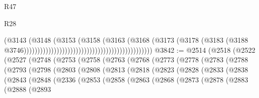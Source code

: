 \begin{lexlean}{R47}
\begin{lexlean}{R28}
\begin{coremodule}
{{{{{{{{{{{{{{{{{{{{{{{{{{{{{{{{{{{{{{{{{{{{{{{{{{{{{{{{{{{{{{{{{{{{{{{{{{{{{{{{{{{{{{{{{{{{{{{{{{{{{{{{{{{{{{{{{{{{{{{{{{{{{{{{{{{{{                                                                              (@3143
                                                                                (@3148
                                                                                  (@3153
                                                                                    (@3158
                                                                                      (@3163
                                                                                        (@3168
                                                                                          (@3173
                                                                                            (@3178
                                                                                              (@3183
                                                                                                (@3188
                                                                                                  @3746)))))))))))))))))))))))))))))))))))))))))))))))
@3842 := @2514
    (@2518
      (@2522
        (@2527
          (@2748
            (@2753
              (@2758
                (@2763
                  (@2768
                    (@2773
                      (@2778
                        (@2783
                          (@2788
                            (@2793
                              (@2798
                                (@2803
                                  (@2808
                                    (@2813
                                      (@2818
                                        (@2823
                                          (@2828
                                            (@2833
                                              (@2838
                                                (@2843
                                                  (@2848
                                                    (@2336
                                                      (@2853
                                                        (@2858
                                                          (@2863
                                                            (@2868
                                                              (@2873
                                                                (@2878
                                                                  (@2883
                                                                    (@2888
                                                                      (@2893
}}}}}}}}}}}}}}}}}}}}}}}}}}}}}}}}}}}}}}}}}}}}}}}}}}}}}}}}}}}}}}}}}}}}}}}}}}}}}}}}}}}}}}}}}}}}}}}}}}}}}}}}}}}}}}}}}}}}}}}}}}}}}}}}}}}}}
\end{coremodule}
\end{lexlean}
\end{lexlean}
